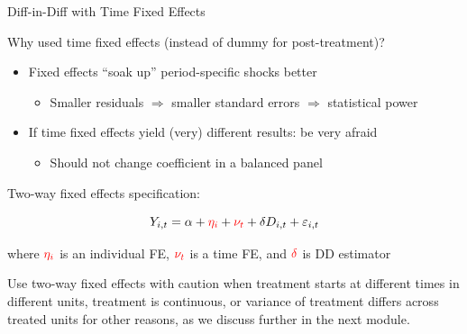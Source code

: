 \documentclass[10pt,xcolor=table,ignorenonframetext,aspectratio=169]{beamer}
\newlength{\wideitemsep}
\let\olditem\item
\renewcommand{\item}{\setlength{\itemsep}{\wideitemsep}\olditem}
\begin{document}
\begin{frame}{Diff-in-Diff with Time Fixed Effects}

\medskip
Why used time fixed effects (instead of dummy for post-treatment)?

\medskip
\begin{itemize}
	
	\item Fixed effects ``soak up'' period-specific shocks better
	
	\medskip
	\begin{itemize}
		
		\item Smaller residuals $\Rightarrow$ smaller standard errors $\Rightarrow$ statistical power
		
	\end{itemize}
	
	\item If time fixed effects yield (very) different results:  be very afraid
	
	\medskip
	\begin{itemize}
		
		\item Should not change coefficient in a balanced panel
		
	\end{itemize}
	
\end{itemize}

\pause
\medskip
\medskip
Two-way fixed effects specification:
\begin{small}
	\begin{equation*}
	Y_{i,t} = \alpha + \textcolor{red}{\eta_i} + \textcolor{red}{\nu_t} + \delta D_{i,t} + \varepsilon_{i,t}
	\end{equation*}
\end{small}

\vspace{-0.5cm}

where $\textcolor{red}{\eta_i}$ is an individual FE, $\textcolor{red}{\nu_t}$ is a time FE, and $\textcolor{red}{\delta}$ is DD estimator

\medskip
\medskip
\tiny{Use two-way fixed effects with caution when treatment starts at different times in different units, treatment is continuous, or variance of treatment differs across treated units for other reasons, as we discuss further in the next module.}


\end{frame}


\end{document}
